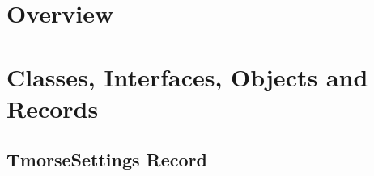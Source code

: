 \documentclass{report}
\newif\ifpdf
\begin{document}
\section{Overview}
\begin{description}
\item[\texttt{\begin{ttfamily}TmorseSettings\end{ttfamily} Record}]
\item[\texttt{\begin{ttfamily}TElementTimings\end{ttfamily} Record}]
\end{description}
\section{Classes, Interfaces, Objects and Records}
\ifpdf
\subsection*{\large{\textbf{TmorseSettings Record}}\normalsize\hspace{1ex}\hrulefill}
\else
\subsection*{TmorseSettings Record}
\fi
\label{morse.base.TmorseSettings}
\end{document}
